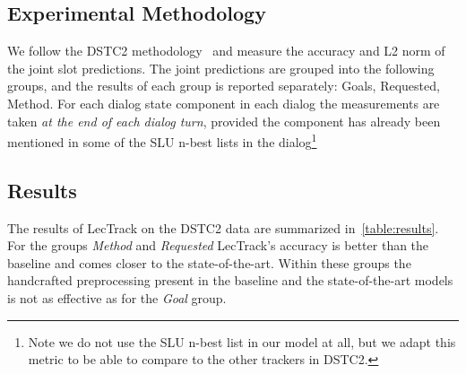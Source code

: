 \documentclass[11pt,twocolumn]{article}
\begin{document}
\subsection{Experimental Methodology}  %
We follow the DSTC2 methodology~\cite{henderson2014second} and measure the accuracy and L2 norm of the joint slot predictions.
The joint predictions are grouped into the following groups, and the results of each group is reported separately: Goals, Requested, Method.
For each dialog state component in each dialog the measurements are taken \emph{at the end of each dialog turn}, provided the component has already been mentioned in some of the SLU n-best lists in the dialog\footnote{Note we do not use the SLU n-best list in our model at all, but we adapt this metric to be able to compare to the other trackers in DSTC2.}


\subsection{Results}
The results of LecTrack on the DSTC2 data are summarized in~\autoref{table:results}. For the groups \emph{Method} and \emph{Requested} LecTrack's accuracy is better than the baseline and comes closer to the state-of-the-art. Within these groups the handcrafted preprocessing present in the baseline and the state-of-the-art models is not as effective as for the \emph{Goal} group.
\end{document}
